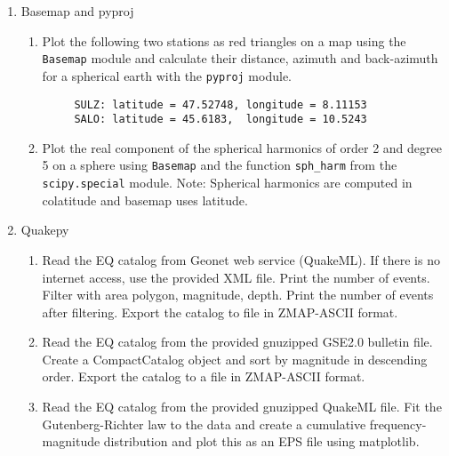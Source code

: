 \documentclass{article}
\begin{document}
\begin{enumerate}
    \item Basemap and pyproj
    \begin{enumerate}
      \item Plot the following two stations as red triangles on a map using the
      \verb#Basemap# module and calculate their distance, azimuth and
      back-azimuth for a spherical earth with the \verb#pyproj# module.\\
	 \begin{verbatim}
	 SULZ: latitude = 47.52748, longitude = 8.11153
	 SALO: latitude = 45.6183,  longitude = 10.5243
	 \end{verbatim}
	 \item Plot the real component of the spherical harmonics of order 
	 2 and degree 5 on a sphere using \verb#Basemap# and the function
	 \verb#sph_harm# from the \verb#scipy.special# module. Note: Spherical
	 harmonics are computed in colatitude and basemap uses latitude. 
      \end{enumerate}
      \item Quakepy
      \begin{enumerate}
        \item Read the EQ catalog from Geonet web service (QuakeML). If there is no 
        internet access, use the provided XML file. Print the number of events.
        Filter with area polygon, magnitude, depth. Print the number of
        events after filtering. Export the catalog to file in ZMAP-ASCII format.
        \item Read the EQ catalog from the provided gnuzipped GSE2.0 bulletin
        file. Create a CompactCatalog object and sort by magnitude in descending
        order. Export the catalog to a file in ZMAP-ASCII format.
        \item Read the EQ catalog from the provided gnuzipped QuakeML file. Fit
        the Gutenberg-Richter law to the data and create a cumulative
        frequency-magnitude distribution and plot this as an EPS file using
        matplotlib.
      \end{enumerate}
\end{enumerate}
\end{document}
